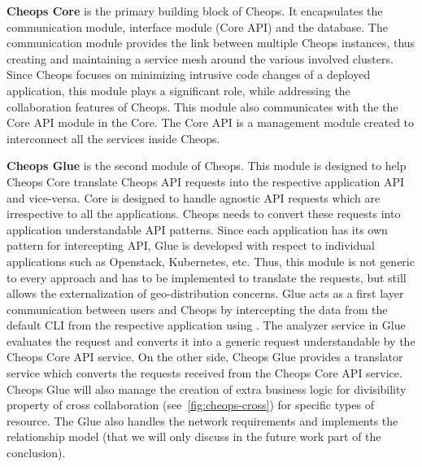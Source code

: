 \begin{description}
\item{\textbf{Cheops Core}} is the primary building block of Cheops.
  It encapsulates the communication module, interface module (Core
  API) and the database.
  The communication module provides the link between multiple Cheops
  instances, thus creating and maintaining a service mesh around the
  various involved clusters.
  Since Cheops focuses on minimizing intrusive code changes of a
  deployed application, this module plays a significant role, while
  addressing the collaboration features of Cheops.
  This module also communicates with the the Core API module in the
  Core.
  The Core API is a management module created to interconnect all the
  services inside Cheops.

\item{\textbf{Cheops Glue}} is the second module of Cheops.
  This module is designed to help Cheops Core translate Cheops API
  requests into the respective application API and vice-versa.
  Core is designed to handle agnostic API requests which are
  irrespective to all the applications.
  Cheops needs to convert these requests into application
  understandable API patterns.
  Since each application has its own pattern for intercepting API,
  Glue is developed with respect to individual applications such as
  Openstack, Kubernetes, etc.
  Thus, this module is not generic to every approach and has to be
  implemented to translate the requests, but still allows the
  externalization of geo-distribution concerns.
  Glue acts as a first layer communication between users and Cheops by
  intercepting the data from the default CLI from the respective
  application using \scl.
  The analyzer service in Glue evaluates the request and converts it
  into a generic request understandable by the Cheops Core API
  service.
  On the other side, Cheops Glue provides a translator service which
  converts the requests received from the Cheops Core API service.
  Cheops Glue will also manage the creation of extra business logic for
  divisibility property of cross collaboration
  (see~\autoref{fig:cheops-cross}) for specific types of resource.
  The Glue also handles the network requirements and implements the
  relationship model (that we will only discuss in the future work
  part of the conclusion).
\end{description}

